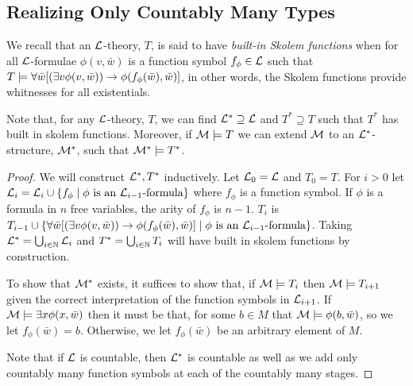 \subsection{Realizing Only Countably Many Types}

\begin{definition}\label{definition_skolem_functions}
We recall that an \(\mathcal{L}\)-theory, \(T\), is said to have \textit{built-in Skolem functions} when for all \(\mathcal{L}\)-formulae \(\phi(v, \bar{w})\) is a function symbol \(f_\phi \in \mathcal{L}\) such that \(T \models \forall \bar{w} [(\exists v \phi(v, \bar{w})) \to \phi(f_\phi(\bar{w}), \bar{w})]\), in other words, the Skolem functions provide whitnesses for all existentials. 
\end{definition}

\begin{theorem}\label{theorem_skolem_function_extension}
Note that, for any \(\mathcal{L}\)-theory, \(T\), we can find \(\mathcal{L}^* \supseteq \mathcal{L}\) and \(T^* \supseteq T\) such that \(T^*\) has built in skolem functions. 
Moreover, if \(\mathcal{M} \models T\) we can extend \(\mathcal{M}\) to an \(\mathcal{L}^*\)-structure, \(\mathcal{M}^*\), such that \(\mathcal{M}^* \models T^*\). 
\end{theorem}

\begin{proof}
We will construct \(\mathcal{L}^*, T^*\) inductively. 
Let \(\mathcal{L}_0 = \mathcal{L}\) and \(T_0 = T\). 
For \(i > 0\) let \(\mathcal{L}_i = \mathcal{L}_i \cup \{f_\phi \mid \phi \text{ is an } \mathcal{L}_{i-1}\text{-formula}\}\) where \(f_\phi\) is a function symbol.
If \(\phi\) is a formula in \(n\) free variables, the arity of \(f_\phi\) is \(n-1\). 
\(T_i\) is \(T_{i-1} \cup \{\forall \bar{w} [(\exists v \phi(v, \bar{w})) \to \phi(f_\phi(\bar{w}), \bar{w})] \mid \phi \text{ is an } \mathcal{L}_{i-1}\text{-formula}\}\).
Taking \(\mathcal{L}^* = \bigcup_{i \in \mathbb{N}} \mathcal{L}_i\) and \(T^* = \bigcup_{i \in \mathbb{N}} T_i\) will have built in skolem functions by construction.

To show that \(\mathcal{M}^*\) exists, it suffices to show that, if \(\mathcal{M} \models T_i\) then \(\mathcal{M} \models T_{i+1}\) given the correct interpretation of the function symbols in \(\mathcal{L}_{i+1}\).
If \(\mathcal{M} \models \exists x \phi(x, \bar{w})\) then it must be that, for some \(b \in M\) that \(\mathcal{M} \models \phi(b, \bar{w})\), so we let \(f_\phi(\bar{w}) = b\). 
Otherwise, we let \(f_\phi(\bar{w})\) be an arbitrary element of \(M\). 

Note that if \(\mathcal{L}\) is countable, then \(\mathcal{L}^*\) is countable as well as we add only countably many function symbols at each of the countably many stages.
\end{proof}


